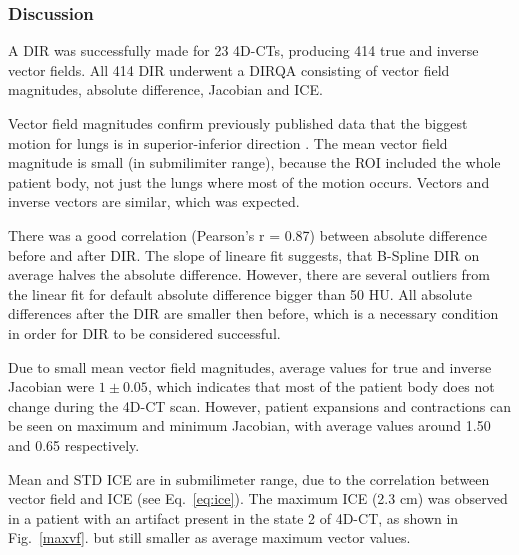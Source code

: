 \newpage
\subsubsection{Discussion}
A DIR was successfully made for 23 4D-CTs, producing 414 true and inverse vector fields. All 414 DIR underwent a DIRQA consisting of vector field magnitudes, absolute difference, Jacobian and ICE.

Vector field magnitudes confirm previously published data that the biggest motion for lungs is in superior-inferior direction \cite{Seppenwoolde2002, Britton2007, Liu2007}. The mean vector field magnitude is small (in submilimiter range), 
because the ROI included the whole patient body, not just the lungs where most of the motion occurs. Vectors and inverse vectors are similar, which was expected.

There was a good correlation (Pearson's r = 0.87) between absolute difference before and after DIR. The slope of lineare fit suggests, that B-Spline DIR on average halves the absolute difference. However, there are several outliers from the
linear fit for default absolute difference bigger than 50 HU. All absolute differences after the DIR are smaller then before, which is a necessary condition in order for DIR to be considered successful.


Due to small mean vector field magnitudes, average values for true and inverse Jacobian were $1\pm0.05$, which indicates that most of the patient body does not change during the 4D-CT
scan. However, patient expansions and contractions can be seen on maximum and minimum Jacobian, with average values around 1.50 and 0.65 respectively. 

Mean and STD ICE are in submilimeter range, due to the correlation between vector field and ICE (see Eq.~\ref{eq:ice}). The maximum ICE (2.3 cm) was observed in a patient with 
an artifact present in the state 2 of 4D-CT, as shown in Fig.~\ref{maxvf}.
but still smaller as average maximum vector values. 

